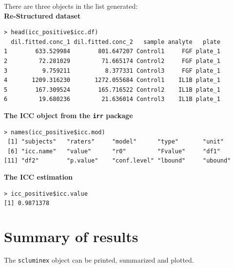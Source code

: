 \documentclass[11pt]{article}\usepackage[]{graphicx}\usepackage[]{color}
\makeatletter
\newenvironment{kframe}{%
 \def\at@end@of@kframe{}%
 \ifinner\ifhmode%
  \def\at@end@of@kframe{\end{minipage}}%
  \begin{minipage}{\columnwidth}%
 \fi\fi%
 \def\FrameCommand##1{\hskip\@totalleftmargin \hskip-\fboxsep
 \colorbox{shadecolor}{##1}\hskip-\fboxsep
     \hskip-\linewidth \hskip-\@totalleftmargin \hskip\columnwidth}%
 \MakeFramed {\advance\hsize-\width
   \@totalleftmargin\z@ \linewidth\hsize
   \@setminipage}}%
 {\par\unskip\endMakeFramed%
 \at@end@of@kframe}
\newenvironment{knitrout}{}{} %
\makeatother
\begin{document}
\noindent There are three objects in the list generated:\\

\noindent \textbf{Re-Structured dataset}
\begin{knitrout}
\color{fgcolor}\begin{kframe}
\begin{verbatim}
> head(icc_positive$icc.df)
  dil.fitted.conc_1 dil.fitted.conc_2   sample analyte   plate
1        633.529984        801.647207 Control1     FGF plate_1
2         72.281029         71.665174 Control2     FGF plate_1
3          9.759211          8.377331 Control3     FGF plate_1
4       1209.316230       1272.055684 Control1    IL1B plate_1
5        167.309524        165.716522 Control2    IL1B plate_1
6         19.680236         21.636014 Control3    IL1B plate_1
\end{verbatim}
\end{kframe}
\end{knitrout}

\noindent \textbf{The ICC object from the {\tt irr} package} 
\begin{knitrout}
\color{fgcolor}\begin{kframe}
\begin{verbatim}
> names(icc_positive$icc.mod)
 [1] "subjects"   "raters"     "model"      "type"       "unit"      
 [6] "icc.name"   "value"      "r0"         "Fvalue"     "df1"       
[11] "df2"        "p.value"    "conf.level" "lbound"     "ubound"    
\end{verbatim}
\end{kframe}
\end{knitrout}

\noindent \textbf{The ICC estimation}
\begin{knitrout}
\color{fgcolor}\begin{kframe}
\begin{verbatim}
> icc_positive$icc.value
[1] 0.9871378
\end{verbatim}
\end{kframe}
\end{knitrout}

\section{Summary of results}

The {\tt scluminex} object can be printed, summarized and plotted.
\end{document}
